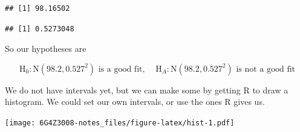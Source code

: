\documentclass[
]{book}
\newenvironment{Shaded}{\begin{snugshade}}{\end{snugshade}}
\newcommand{\CommentTok}[1]{\textcolor[rgb]{0.56,0.35,0.01}{\textit{#1}}}
\newcommand{\DataTypeTok}[1]{\textcolor[rgb]{0.13,0.29,0.53}{#1}}
\newcommand{\KeywordTok}[1]{\textcolor[rgb]{0.13,0.29,0.53}{\textbf{#1}}}
\newcommand{\NormalTok}[1]{#1}
\newcommand{\OperatorTok}[1]{\textcolor[rgb]{0.81,0.36,0.00}{\textbf{#1}}}
\newcommand{\StringTok}[1]{\textcolor[rgb]{0.31,0.60,0.02}{#1}}
\theoremstyle{definition}
\theoremstyle{definition}
\theoremstyle{definition}
\theoremstyle{definition}
\theoremstyle{remark}
\begin{document}
\begin{Shaded}
\end{Shaded}

\begin{verbatim}
## [1] 98.16502
\end{verbatim}

\begin{Shaded}
\end{Shaded}

\begin{verbatim}
## [1] 0.5273048
\end{verbatim}

So our hypotheses are

\[\text{H}_0: \text{N}(98.2,0.527^2) \text{ is a good fit}, \ \ \ \ \ \text{H}_A: \text{N}(98.2,0.527^2) \text{ is not a good fit}\]

We do not have intervals yet, but we can make some by getting R to draw a histogram. We could set our own intervals, or use the ones R gives us.

\begin{Shaded}
\end{Shaded}

\texttt{[image: 6G4Z3008-notes\_files/figure-latex/hist-1.pdf]}

\begin{Shaded}
\end{Shaded}
\end{document}
